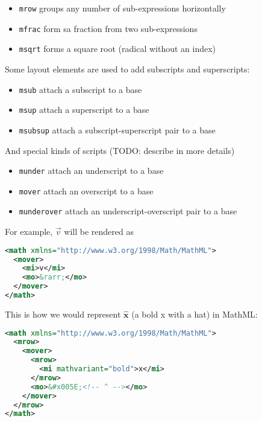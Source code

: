 \begin{itemize}
\itemsep1pt\parskip0pt
\item
  \texttt{mrow} groups any number of sub-expressions horizontally
\item
  \texttt{mfrac} form sa fraction from two sub-expressions
\item
  \texttt{msqrt} forms a square root (radical without an index)
\end{itemize}

Some layout elements are used to add subscripts and superscripts:

\begin{itemize}
\itemsep1pt\parskip0pt
\item
  \texttt{msub} attach a subscript to a base
\item
  \texttt{msup} attach a superscript to a base
\item
  \texttt{msubsup} attach a subscript-superscript pair to a base
\end{itemize}

And special kinds of scripts (TODO: describe in more details)

\begin{itemize}
\itemsep1pt\parskip0pt
\item
  \texttt{munder} attach an underscript to a base
\item
  \texttt{mover} attach an overscript to a base
\item
  \texttt{munderover} attach an underscript-overscript pair to a base
\end{itemize}

For example, $\vec v$ will be rendered as

\begin{lstlisting}[language=XML,caption={TODO},label={}]
<math xmlns="http://www.w3.org/1998/Math/MathML">
  <mover>
    <mi>v</mi>
    <mo>&rarr;</mo>
  </mover>
</math>
\end{lstlisting}


This is how we would represent $\hat{ \mathbf x}$ (a bold x with a hat) in MathML:

\begin{lstlisting}[language=XML,caption={TODO},label={}]
<math xmlns="http://www.w3.org/1998/Math/MathML">
  <mrow>
    <mover>
      <mrow>
        <mi mathvariant="bold">x</mi>
      </mrow>
      <mo>&#x005E;<!-- ^ --></mo>
    </mover>
  </mrow>
</math>
\end{lstlisting}

